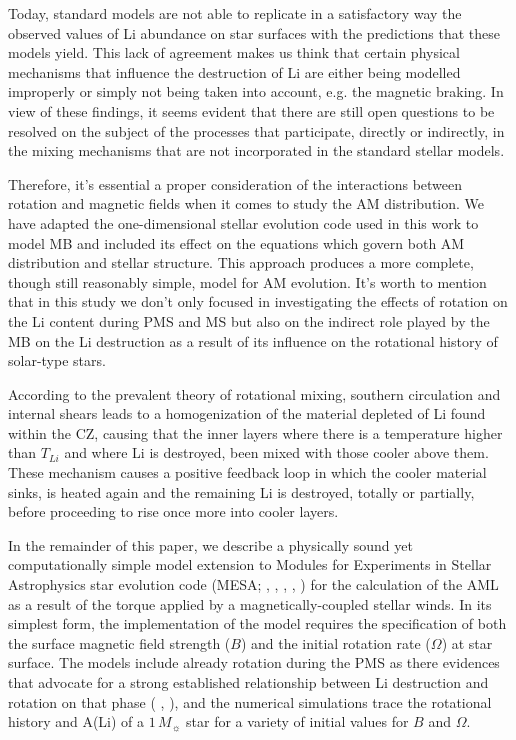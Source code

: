 \documentclass[fleqn,usenatbib]{mnras}
\begin{document}
Today, standard models are not able to replicate in a satisfactory way the observed values of Li abundance on star surfaces with the predictions that these models yield. This lack of agreement makes us think that certain physical mechanisms that influence the destruction of Li are either being modelled improperly or simply not being taken into account, e.g. the magnetic braking. In view of these findings, it seems evident that there are still open questions to be resolved on the subject of the processes that participate, directly or indirectly, in the mixing mechanisms that are not incorporated in the standard stellar models.\par

Therefore, it's essential a proper consideration of the interactions between rotation and magnetic fields when it comes to study the AM distribution. We have adapted the one-dimensional stellar evolution code used in this work to model MB and included its effect on the equations which govern both AM distribution and stellar structure. This approach produces a more complete, though still reasonably simple, model for AM evolution. It's worth to mention that in this study we don't only focused in investigating the effects of rotation on the Li content during PMS and MS but also on the indirect role played by the MB on the Li destruction as a result of its influence on the rotational history of solar-type stars.\par

According to the prevalent theory of rotational mixing, southern circulation and internal shears leads to a homogenization of the material depleted of Li found within the CZ, causing that the inner layers where there is a temperature higher than $T_{Li}$ and where Li is destroyed, been mixed with those cooler above them. These mechanism causes a positive feedback loop in which the cooler material sinks, is heated again and the remaining Li is destroyed, totally or partially, before proceeding to rise once more into cooler layers. \par

In the remainder of this paper, we describe a physically sound yet computationally simple model extension to Modules for Experiments in Stellar Astrophysics star evolution code (MESA; \citeauthor{Paxton2011} \citeyear{Paxton2011}, \citeyear{Paxton2013}, \citeyear{Paxton2015}, \citeyear{Paxton2018}, \citeyear{Paxton2019}) for the calculation of the AML as a result of the torque applied by a magnetically-coupled stellar winds. In its simplest form, the implementation of the model requires the specification of both the surface magnetic field strength ($B$) and the initial rotation rate ($\Omega$) at star surface. The models include already rotation during the PMS as there evidences that advocate for a strong established relationship between Li destruction and rotation on that phase (\citeauthor{Bouvier2016} \citeyear{Bouvier2016}, \citeyear{Bouvier2018}), and the numerical simulations trace the rotational history and A(Li) of a $1\, M_{\sun}$ star for a variety of initial values for $B$ and $\Omega$.\par
\end{document}

